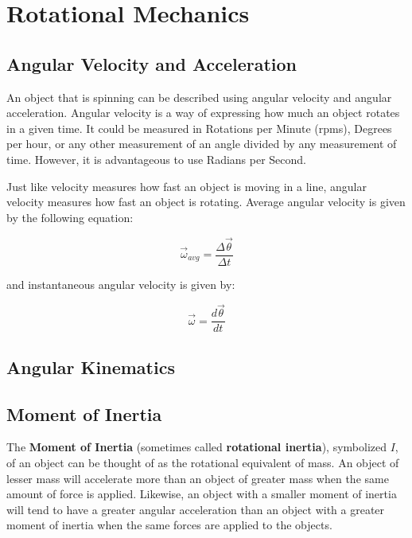 \chapter{Rotational Mechanics}
	\section{Angular Velocity and Acceleration}
	An object that is spinning can be described using angular velocity and angular acceleration.  Angular velocity is a way of expressing how much an object rotates in a given time.  It could be measured in Rotations per Minute (rpms), Degrees per hour, or any other measurement of an angle divided by any measurement of time.  However, it is advantageous to use Radians per Second.
	
	  Just like velocity measures how fast an object is moving in a line, angular velocity measures how fast an object is rotating.    Average angular velocity is given by the following equation:
	  	\begin{mdframed}[backgroundcolor=orange!20!white]
	  \begin{equation}
		\vec{\omega}_{avg} = \frac{\Delta \vec{\theta}}{\Delta t}
	  \end{equation}
	\end{mdframed}
	and instantaneous angular velocity is given by: 
	  	\begin{mdframed}[backgroundcolor=orange!20!white]
	\begin{equation}
	\vec{\omega} = \frac{d \vec{\theta}}{d t}
	\end{equation}
\end{mdframed}


	\section{Angular Kinematics}
	\newpage
	\section{Moment of Inertia}
	  
	The \textbf{Moment of Inertia} (sometimes called \textbf{rotational inertia}), symbolized $I$, of an object can be thought of as the rotational equivalent of mass.  An object of lesser mass will accelerate more than an object of greater mass when the same amount of force is applied.  Likewise, an object with a smaller moment of inertia will tend to have a greater angular acceleration than an object with a greater moment of inertia when the same forces are applied to the objects.  
	
